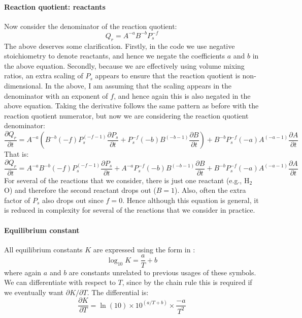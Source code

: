 \paragraph{Reaction quotient: reactants}
Now consider the denominator of the reaction quotient:
\begin{equation}
Q_r = A^{-a} B^{-b} P_s^{-f}
\end{equation}
The above deserves some clarification.  Firstly, in the code we use negative stoichiometry to denote reactants, and hence we negate the coefficients $a$ and $b$ in the above equation.  Secondly, because we are effectively using volume mixing ratios, an extra scaling of $P_s$ appears to ensure that the reaction quotient is non-dimensional.  In the above, I am assuming that the scaling appears in the denominator with an exponent of $f$, and hence again this is also negated in the above equation.  Taking the derivative follows the same pattern as before with the reaction quotient numerator, but now we are considering the reaction quotient denominator:
\begin{equation}
\frac{\partial Q_r}{\partial t} = A^{-a} \left( B^{-b}(-f)P_s^{(-f-1)} \frac{\partial P_s}{\partial t} + P_s^{-f} (-b)B^{(-b-1)} \frac{\partial B}{\partial t} \right) + B^{-b} P_s^{-f} (-a) A^{(-a-1)} \frac{\partial A}{\partial t}
\end{equation}
That is:
\begin{equation}
\frac{\partial Q_r}{\partial t} = A^{-a} B^{-b}(-f)P_s^{(-f-1)} \frac{\partial P_s}{\partial t} + A^{-a} P_s^{-f} (-b)B^{(-b-1)} \frac{\partial B}{\partial t} + B^{-b} P_s^{-f} (-a) A^{(-a-1)} \frac{\partial A}{\partial t}
\end{equation}
For several of the reactions that we consider, there is just one reactant (e.g., H$_2$O) and therefore the second reactant drops out ($B=1$).  Also, often the extra factor of $P_s$ also drops out since $f=0$.  Hence although this equation is general, it is reduced in complexity for several of the reactions that we consider in practice.
\paragraph{Equilibrium constant}
All equilibrium constants $K$ are expressed using the form in \cite{SF17}:
\begin{equation}
\log_{10} K = \frac{a}{T} + b
\end{equation}
where again $a$ and $b$ are constants unrelated to previous usages of these symbols.  We can differentiate with respect to $T$, since by the chain rule this is required if we eventually want $\partial K/\partial T$.  The differential is:
\begin{equation}
\frac{\partial K}{\partial T} = \ln(10) \times 10^{(a/T+b)} \times \frac{-a}{T^2}
\end{equation}
